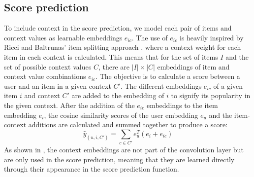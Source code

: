 \subsection{Score prediction}\label{subsec:csgcn_is_score_prediction}
To include context in the score prediction, we model each pair of items and context values as learnable embeddings $e_{ic}$.
The use of $e_{ic}$ is heavily inspired by Ricci and Baltrunas' item splitting approach \cite{baltrunasitemsplitting}, where a context weight for each item in each context is calculated.
This means that for the set of items $I$ and the set of possible context values $C$, there are $|I| \times |C|$ embeddings of item and context value combinations $e_{ic}$.
The objective is to calculate a score between a user and an item in a given context $C'$.
The different embeddings $e_{ic}$ of a given item $i$ and context $C'$ are added to the embedding of $i$ to signify its popularity in the given context.
After the addition of the $e_{ic}$ embeddings to the item embedding $e_i$, the cosine similarity scores of the user embedding $e_u$ and the item-context additions are calculated and summed together to produce a score: 
\begin{equation}\label{eq:is-score-pred}
  \hat{y}_{(u,i,C')} = \sum_{c \in C'} e_u^T(e_i+e_{ic})
\end{equation}
As shown in , the context embeddings are not part of the convolution layer but are only used in the score prediction, meaning that they are learned directly through their appearance in the score prediction function.


